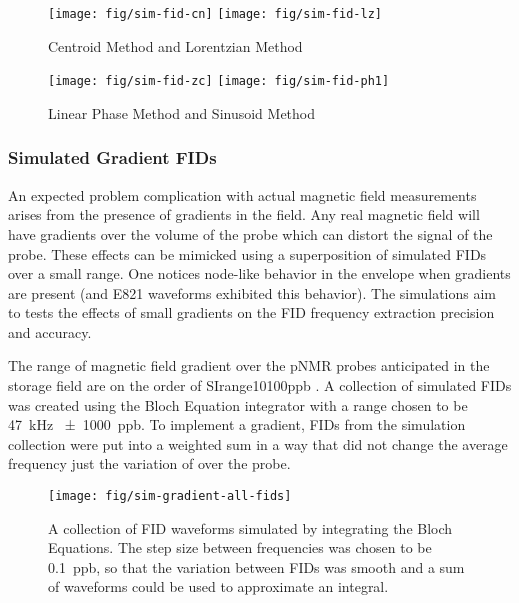 \begin{figure}
    \label{fig:sim-fid-spectral}
    \texttt{[image: fig/sim-fid-cn]}
    \texttt{[image: fig/sim-fid-lz]}
    \caption{Centroid Method and Lorentzian Method}
\end{figure}

\begin{figure}
    \label{fig:sim-fid-time-domain}
    \texttt{[image: fig/sim-fid-zc]}
    \texttt{[image: fig/sim-fid-ph1]}
    \caption{Linear Phase Method and Sinusoid Method}
\end{figure}


\subsubsection{Simulated Gradient FIDs}
An expected problem complication with actual magnetic field measurements arises from the presence of gradients in the field.  Any real magnetic field will have gradients over the volume of the probe which can distort the signal of the probe.  These effects can be mimicked using a superposition of simulated FIDs over a small range.  One notices node-like behavior in the envelope when gradients are present (and E821 waveforms exhibited this behavior).  The simulations aim to tests the effects of small gradients on the FID frequency extraction precision and accuracy.

The range of magnetic field gradient over the pNMR probes anticipated in the \gmtwo storage field are on the order of SIrange{10}{100}{ppb} . A collection of simulated FIDs was created using the Bloch Equation integrator with a range chosen to be \SI{47}{\kHz} \SI{\pm 1000}{ppb}. To implement a gradient, FIDs from the simulation collection were put into a weighted sum in a way that did not change the average frequency just the variation of over the probe.

\begin{figure}
\label{fig:sim-gradient-all-fids}
\texttt{[image: fig/sim-gradient-all-fids]}
\caption{A collection of FID waveforms simulated by integrating the Bloch Equations.  The step size between frequencies was chosen to be \SI{0.1}{ppb}, so that the variation between FIDs was smooth and a sum of waveforms could be used to approximate an integral.}
\end{figure}

